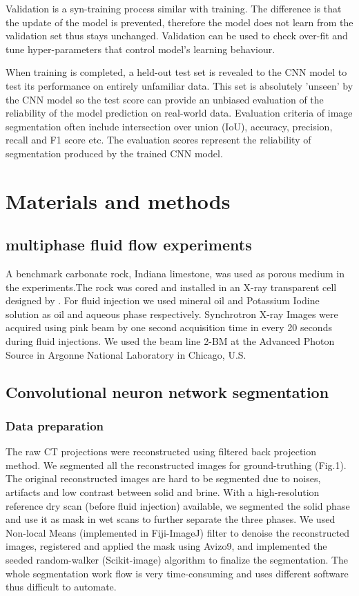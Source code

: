 \documentclass[draft,linenumbers]{agujournal2018}
\begin{document}
Validation is a syn-training process similar with training. The difference is that the update of the model is prevented, therefore the model does not learn from the validation set thus stays unchanged. Validation can be used to check over-fit and tune hyper-parameters that control model's learning behaviour. 

When training is completed, a held-out test set is revealed to the CNN model to test its performance on entirely unfamiliar data. This set is absolutely 'unseen' by the CNN model so the test score can provide an unbiased evaluation of the reliability of the model prediction on real-world data. Evaluation criteria of image segmentation often include intersection over union (IoU), accuracy, precision, recall and F1 score etc. The evaluation scores represent the reliability of segmentation produced by the trained CNN model.
\section{Materials and methods}
\subsection{multiphase fluid flow experiments}
A benchmark carbonate rock, Indiana limestone, was used as porous medium in the experiments.The rock was cored and installed in an X-ray transparent cell designed by \citet{fusseis2014low}. For fluid injection we used mineral oil and Potassium Iodine solution as oil and aqueous phase respectively. Synchrotron X-ray Images were acquired using pink beam by one second acquisition time in every 20 seconds during fluid injections. We used the beam line 2-BM at the Advanced Photon Source in Argonne National Laboratory in Chicago, U.S.

\subsection{Convolutional neuron network segmentation}
\subsubsection{Data preparation}
The raw CT projections were reconstructed using filtered back projection method. We segmented all the reconstructed images for ground-truthing (Fig.1). The original reconstructed images are hard to be segmented due to noises, artifacts and low contrast between solid and brine. With a high-resolution reference dry scan (before fluid injection) available, we segmented the solid phase and use it as mask in wet scans to further separate the three phases. We used Non-local Means (implemented in Fiji-ImageJ) filter to denoise the reconstructed images, registered and applied the mask using Avizo9\texttrademark, and implemented the seeded random-walker (Scikit-image) algorithm to finalize the segmentation. The whole segmentation work flow is very time-consuming and uses different software thus difficult to automate.
\end{document}
